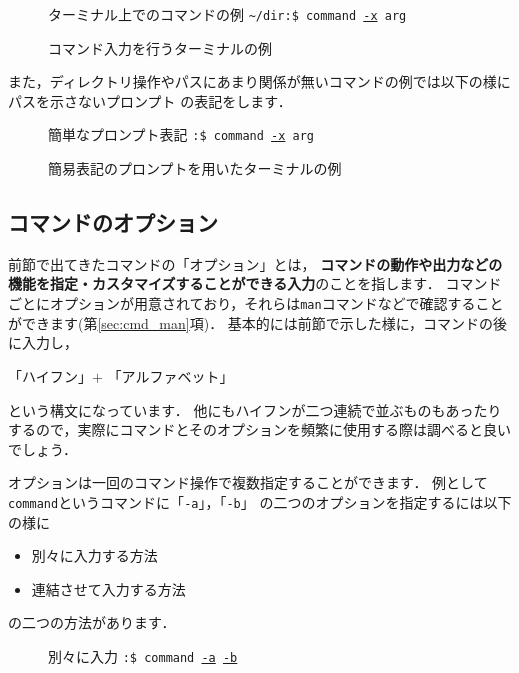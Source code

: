 \documentclass[autodetect-engine,dvi=dvipdfmx,ja=standard,a4j]{bxjsarticle}
\newcommand{\cmd}[1]{\textcolor{yellow!70!white} {#1}}
\newcommand{\dirpath}[1]{\textcolor{Cerulean}{#1}}
\newcommand{\prompt}[1]{\texttt{\dirpath{#1}:\$ }}
\newcommand{\termtext}[2]{\Large{\prompt{#1}\texttt{#2}}}
\begin{document}
\begin{figure}[H]
    \begin{terminal}{ターミナル上でのコマンドの例}
        \termtext{\textasciitilde/dir}{\cmd{command} \underline{-x} arg}
    \end{terminal}
    \caption*{コマンド入力を行うターミナルの例}
\end{figure}

また，ディレクトリ操作やパスにあまり関係が無いコマンドの例では以下の様にパスを示さないプロンプト
の表記をします．

\begin{figure}[H]
    \begin{terminal}{簡単なプロンプト表記}
        \termtext{}{\cmd{command} \underline{-x} arg}
    \end{terminal}
    \caption*{簡易表記のプロンプトを用いたターミナルの例}
\end{figure}

\subsection{コマンドのオプション}
前節で出てきたコマンドの「オプション」とは，
\textbf{コマンドの動作や出力などの機能を指定・カスタマイズすることができる入力}のことを指します．
コマンドごとにオプションが用意されており，それらは\verb|man|コマンドなどで確認することができます(第\ref{sec:cmd_man}項)．
基本的には前節で示した様に，コマンドの後に入力し，
\begin{center}
    「ハイフン」$+$ 「アルファベット」
\end{center}
という構文になっています．
他にもハイフンが二つ連続で並ぶものもあったりするので，実際にコマンドとそのオプションを頻繁に使用する際は調べると良いでしょう．

オプションは一回のコマンド操作で複数指定することができます．
例として\verb|command|というコマンドに「\verb|-a|」，「\verb|-b|」
の二つのオプションを指定するには以下の様に
\begin{itemize}
    \item 別々に入力する方法
    \item 連結させて入力する方法
\end{itemize}
の二つの方法があります．

\begin{figure}[H]
    \begin{terminal}{別々に入力}
        \termtext{}{\cmd{command} \underline{-a} \underline{-b}}
    \end{terminal}
\end{figure}
\end{document}
